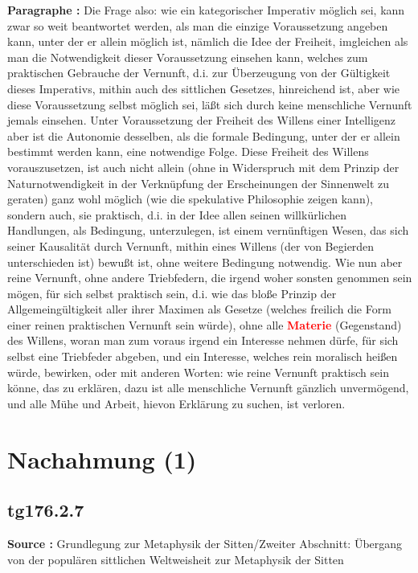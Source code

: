\documentclass[a4paper,12pt,twoside]{book}
\newcommand{\match}[1]{\textcolor{red}{\textbf{#1}}}
\newcommand{\unnumberedsection}[1]{
	\section*{#1}
	\addcontentsline{toc}{section}{#1}
	\markright{#1}
}
\begin{document}
	\noindent\textbf{Paragraphe : }Die Frage also: wie ein kategorischer Imperativ möglich sei, kann zwar so weit beantwortet werden, als man die einzige Voraussetzung angeben kann, unter der er allein möglich ist, nämlich die Idee der Freiheit, imgleichen als man  die Notwendigkeit dieser Voraussetzung einsehen kann, welches zum praktischen Gebrauche der Vernunft, d.i. zur Überzeugung von der Gültigkeit dieses Imperativs, mithin auch des sittlichen Gesetzes, hinreichend ist, aber wie diese Voraussetzung selbst möglich sei, läßt sich durch keine menschliche Vernunft jemals einsehen. Unter Voraussetzung der Freiheit des Willens einer Intelligenz aber ist die Autonomie desselben, als die formale Bedingung, unter der er allein bestimmt werden kann, eine notwendige Folge. Diese Freiheit des Willens vorauszusetzen, ist auch nicht allein (ohne in Widerspruch mit dem Prinzip der Naturnotwendigkeit in der Verknüpfung der Erscheinungen der Sinnenwelt zu geraten) ganz wohl möglich (wie die spekulative Philosophie zeigen kann), sondern auch, sie praktisch, d.i. in der Idee allen seinen willkürlichen Handlungen, als Bedingung, unterzulegen, ist einem vernünftigen Wesen, das sich seiner Kausalität durch Vernunft, mithin eines Willens (der von Begierden unterschieden ist) bewußt ist, ohne weitere Bedingung notwendig. Wie nun aber reine Vernunft, ohne andere Triebfedern, die irgend woher sonsten genommen sein mögen, für sich selbst praktisch sein, d.i. wie das bloße Prinzip der Allgemeingültigkeit aller ihrer Maximen als Gesetze (welches freilich die Form einer reinen praktischen Vernunft sein würde), ohne alle \match{Materie} (Gegenstand) des Willens, woran man zum voraus irgend ein Interesse nehmen dürfe, für sich selbst eine Triebfeder abgeben, und ein Interesse, welches rein moralisch heißen würde, bewirken, oder mit anderen Worten: wie reine Vernunft praktisch sein könne, das zu erklären, dazu ist alle menschliche Vernunft gänzlich unvermögend, und alle Mühe und Arbeit, hievon Erklärung zu suchen, ist verloren. 
	
	\unnumberedsection{Nachahmung (1)} 
	\subsection*{tg176.2.7} 
	\textbf{Source : }Grundlegung zur Metaphysik der Sitten/Zweiter Abschnitt: Übergang von der populären sittlichen Weltweisheit zur Metaphysik der Sitten\\  
	
\end{document}
